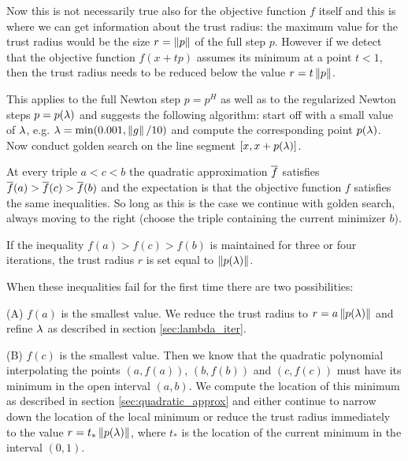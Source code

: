 Now this is not necessarily true also for the objective function $f$ itself and this is where we can get information 
about the trust radius: the maximum value for the trust radius would be the size $r=\left\|p\right\|$ of the full step $p$. 
However if we detect that the objective function $f(x+tp)$ assumes its minimum at a point $t<1$, then the trust radius 
needs to be reduced below the value $r=t\left\|p\right\|$. 

\noindent
This applies to the full Newton step $p=p^H$ as well as to the regularized Newton steps $p=p(\lambda)$ and suggests 
the following algorithm: start off with a small value of $\lambda$, e.g. $\lambda=\min(0.001,\left\|g\right\|/10)$ and compute the 
corresponding point $p(\lambda)$. Now conduct golden search on the line segment $[x,x+p(\lambda)]$. 

At every triple $a<c<b$ the quadratic approximation $\overline f$ satisfies $\overline f(a)>\overline f(c)>\overline f(b)$ and the expectation 
is that the objective function $f$ satisfies the same inequalities. So long as this is the case we continue with 
golden search, always moving to the right (choose the triple containing the current minimizer $b$).

If the inequality $f(a)>f(c)>f(b)$ is maintained for three or four iterations, the trust radius $r$ is set equal
to $\left\|p(\lambda)\right\|$. 

\noindent
When these inequalities fail for the first time there are two possibilities:

\smallskip\noindent
(A) $f(a)$ is the smallest value. We reduce the trust radius to $r=a\left\|p(\lambda)\right\|$ and refine $\lambda$ as described in
section \ref{sec:lambda_iter}.

\smallskip\noindent
(B) $f(c)$ is the smallest value. Then we know that the quadratic polynomial interpolating the points
$(a,f(a))$, $(b,f(b))$ and $(c,f(c))$ must have its minimum in the open interval $(a,b)$. We compute the location
of this minimum as described in section \ref{sec:quadratic_approx} and either continue to narrow down the location 
of the local minimum or reduce the trust radius immediately to the value $r=t_*\left\|p(\lambda)\right\|$, where $t_*$ is the 
location of the current minimum in the interval $(0,1)$.






 
